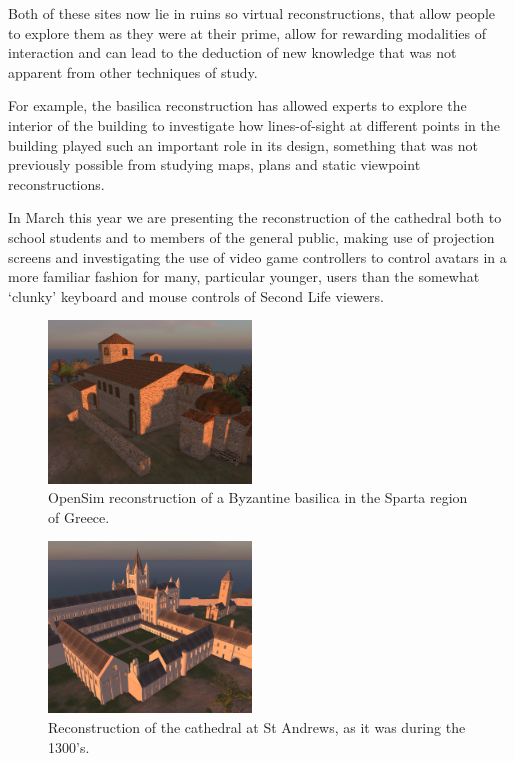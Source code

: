 \documentclass{sig-alternate}
\begin{document}
{Both of these sites now lie in ruins so virtual reconstructions, that allow people to explore them as they were at their prime, allow for rewarding modalities of interaction and can lead to the deduction of new knowledge that was not apparent from other techniques of study.

For example, the basilica reconstruction has allowed experts to explore the interior of the building to investigate how lines-of-sight at different points in the building played such an important role in its design, something that was not previously possible from studying maps, plans and static viewpoint reconstructions.

In March this year we are presenting the reconstruction of the cathedral both to school students and to members of the general public, making use of projection screens and investigating the use of video game controllers to control avatars in a more familiar fashion for many, particular younger, users than the somewhat `clunky' keyboard and mouse controls of Second Life viewers.

\begin{figure}[]
\centering
\includegraphics[width=0.48\textwidth]{basilicascreenshot.png}
\caption{OpenSim reconstruction of a Byzantine basilica in the Sparta region of Greece.}
\label{basilicascreenshot}
\end{figure}

\begin{figure}[]
\centering
\includegraphics[width=0.48\textwidth]{cathedralscreenshot.png}
\caption{Reconstruction of the cathedral at St Andrews, as it was during the 1300's.}
\label{cathedralscreenshot}
\end{figure}

}
\end{document}

